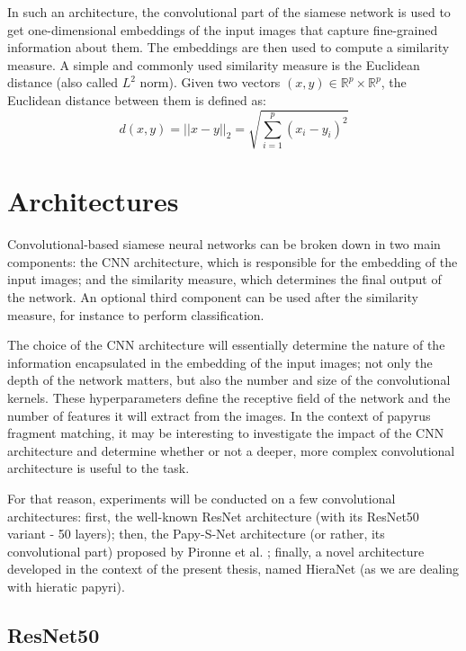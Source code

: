 \documentclass[11pt]{report}
\begin{document}
In such an architecture, the convolutional part of the siamese network is used to get one-dimensional embeddings of the input images that capture fine-grained information about them. The embeddings are then used to compute a similarity measure. A simple and commonly used similarity measure is the Euclidean distance (also called $L^2$ norm).\newline
Given two vectors $(x,y) \in \mathbb{R}^p \times \mathbb{R}^p$, the Euclidean distance between them is defined as:
$$d(x,y) = ||x - y||_{2} = \sqrt{\sum_{i = 1}^{p} (x_i - y_i)^2}$$

\section{Architectures}
\label{sec:arch}

Convolutional-based siamese neural networks can be broken down in two main components: the CNN architecture, which is responsible for the embedding of the input images; and the similarity measure, which determines the final output of the network. An optional third component can be used after the similarity measure, for instance to perform classification.\newline

The choice of the CNN architecture will essentially determine the nature of the information encapsulated in the embedding of the input images; not only the depth of the network matters, but also the number and size of the convolutional kernels. These hyperparameters define the receptive field of the network and the number of features it will extract from the images.\newline
In the context of papyrus fragment matching, it may be interesting to investigate the impact of the CNN architecture and determine whether or not a deeper, more complex convolutional architecture is useful to the task.\newline

For that reason, experiments will be conducted on a few convolutional architectures: first, the well-known ResNet architecture (with its ResNet50 variant - 50 layers); then, the Papy-S-Net architecture (or rather, its convolutional part) proposed by Pironne et al. \cite{pir19}; finally, a novel architecture developed in the context of the present thesis, named HieraNet (as we are dealing with hieratic papyri).


\subsection{ResNet50}
\end{document}
